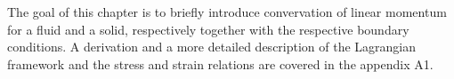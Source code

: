 The goal of this chapter is to briefly introduce convervation of linear momentum for a fluid and a solid, respectively together with the respective boundary conditions. A derivation and a more detailed description of the Lagrangian framework and the stress and strain relations are covered in the appendix A1.

